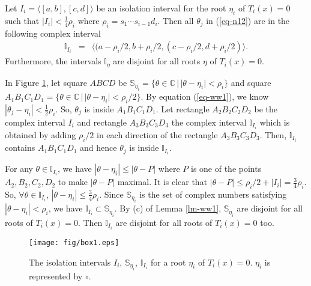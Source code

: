 \documentclass[amsthm]{JSC_LaTex_2007_Mar_12/elsart}
\def\bref#1{(\ref{#1})}
\def\C{{\mathbb{C}}}
\begin{document}
\begin{lem}\label{lm-rr1}
Let $I_i=\langle[a,b],[c,d]\rangle$ be an isolation interval for the
root $\eta_i$ of $T_i(x)=0$ such that $|I_i|< \frac{1}{4}\rho_i$
where $\rho_i=s_1\cdots s_{i-1}d_{i}$. Then all $\theta_j$ in
\bref{eq-n12} are in the following complex interval
\begin{eqnarray}\label{eq-nbh1}
\mathbb{I}_{I_i} &=&\langle(a-\rho_i/2,b+\rho_i/2,
(c-\rho_i/2,d+\rho_i/2)\rangle.
\end{eqnarray}
Furthermore, the intervals $\mathbb{I}_{\eta}$ are disjoint for all
roots $\eta$ of $T_i(x)=0$.
\end{lem}
\begin{pf}
In Figure \ref{fig-box1}, let square $ABCD$ be $\mathbb{S}_{\eta_i}
= \{\theta\in \C\, |\, |\theta-\eta_i|< \rho_i \}$ and  square
$A_1B_1C_1D_1 = \{\theta\in\C\,|\, |\theta-\eta_i| < \rho_i/2\}$.
By equation \bref{eq-ww1}, we know $|\theta_{j}-\eta_{i}|<
\frac{1}{2}\rho_i.$ So, $\theta_j$ is inside $A_1B_1C_1D_1$.
Let rectangle $A_2B_2C_2D_2$ be the complex interval $I_i$ and
rectangle $A_3B_3C_3D_3$ the complex interval $\mathbb{I}_{I_i}$
which is obtained by adding $\rho_i/2$ in each direction of the
rectangle $A_3B_3C_3D_3$.
Then, $\mathbb{I}_{I_i}$ contains $A_1B_1C_1D_1$ and hence
$\theta_{j}$ is inside $\mathbb{I}_{I_i}$.

For any $\theta\in\mathbb{I}_{I_i}$, we have $|\theta-\eta_i| \le
|\theta-P|$ where $P$ is one of the points $A_2,B_2,C_2,D_2$ to make
$|\theta-P|$ maximal. It is clear that $|\theta-P|\le \rho_i/2 +
|I_i| = \frac{3}{4}\rho_i$. So, $\forall\theta\in\mathbb{I}_{I_i}$,
$|\theta-\eta_i| \le \frac{3}{4}\rho_i$. Since $\mathbb{S}_{\eta_i}$
is the set of complex numbers satisfying $|\theta-\eta_i|< \rho_i$,
we have $\mathbb{I}_{I_i}\subset\mathbb{S}_{\eta_i}$.
By (c) of Lemma \ref{lm-ww1}, $\mathbb{S}_{\eta_i}$ are disjoint for
all roots of $T_i(x)=0$. Then  $\mathbb{I}_{I_i}$ are disjoint for
all roots of $T_i(x)=0$ too.
\end{pf}

\begin{figure}[ht]
\centering
\begin{minipage}{0.7\textwidth}
\centering
 \texttt{[image: fig/box1.eps]}
 \caption{The isolation intervals $I_i$, $\mathbb{S}_{\eta_i}$, $\mathbb{I}_{I_i}$ for a root $\eta_i$ of $T_i(x)=0$.
 $\eta_i$ is represented by $\circ$.}
\label{fig-box1}
\end{minipage}
\end{figure}
\end{document}
